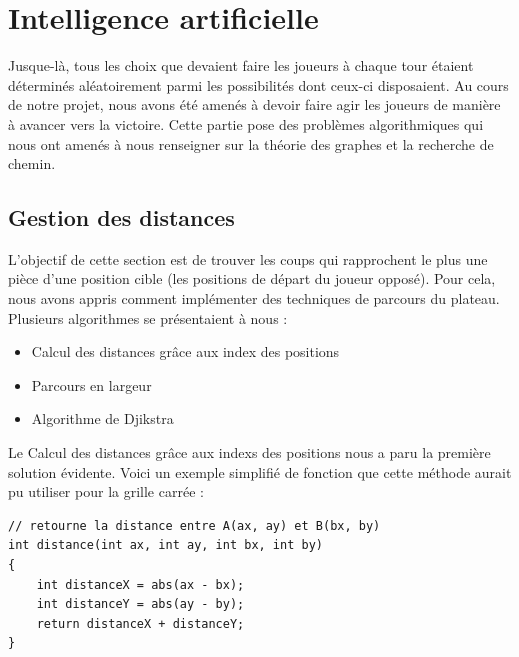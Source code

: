\documentclass{article}
\begin{document}
\newpage
\section{Intelligence artificielle} 
\label{sec:IA}

Jusque-là, tous les choix que devaient faire les joueurs à chaque tour étaient déterminés aléatoirement parmi les possibilités dont ceux-ci disposaient. 
Au cours de notre projet, nous avons été amenés à devoir faire agir les joueurs de manière à avancer vers la victoire.
Cette partie pose des problèmes algorithmiques qui nous ont amenés à nous renseigner sur la théorie des graphes et la recherche de chemin.

\subsection{Gestion des distances}

L'objectif de cette section est de trouver les coups qui rapprochent le plus une pièce d'une position cible (les positions de départ du joueur opposé).
Pour cela, nous avons appris comment implémenter des techniques de parcours du plateau.
Plusieurs algorithmes se présentaient à nous :
\begin{itemize}
    \item Calcul des distances grâce aux index des positions
    \item Parcours en largeur
    \item Algorithme de Djikstra 
    \\
\end{itemize}

Le Calcul des distances grâce aux indexs des positions nous a paru la première solution évidente.
Voici un exemple simplifié de fonction que cette méthode aurait pu utiliser pour la grille carrée :

\begin{lstlisting}[caption=exemple de distance]
// retourne la distance entre A(ax, ay) et B(bx, by)
int distance(int ax, int ay, int bx, int by) 
{
    int distanceX = abs(ax - bx);
    int distanceY = abs(ay - by);
    return distanceX + distanceY;
}
\end{lstlisting}
\end{document}
